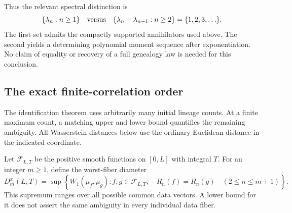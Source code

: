 \documentclass[11pt]{article}
\theoremstyle{definition}
\theoremstyle{remark}
\numberwithin{equation}{section}
\begin{document}
Thus the relevant spectral distinction is
\[
 \{\lambda_n:n\ge1\}\quad\hbox{versus}\quad
 \{\lambda_n-\lambda_{n-1}:n\ge2\}=\{1,2,3,\ldots\}.
\]
The first set admits the compactly supported annihilators used above.
The second yields a determining polynomial moment sequence after
exponentiation.  No claim of equality or recovery of a full genealogy law
is needed for this conclusion.

\subsection{The exact finite-correlation order}

The identification theorem uses arbitrarily many initial lineage counts.
At a finite maximum count, a matching upper and lower bound quantifies
the remaining ambiguity.  All Wasserstein distances below use the
ordinary Euclidean distance in the indicated coordinate.

Let $\mathcal F_{L,T}$ be the positive smooth functions on $[0,L]$ with
integral $T$.  For an integer $m\ge1$, define the worst-fiber diameter
\[
 D_m^x(L,T)=\sup\left\{W_1(\mu_f,\mu_g):
   f,g\in\mathcal F_{L,T},\quad R_n(f)=R_n(g)\quad(2\le n\le m+1)
                                                       \right\}.
\]
This supremum ranges over all possible common data vectors.  A lower
bound for it does not assert the same ambiguity in every individual
data fiber.
\end{document}
